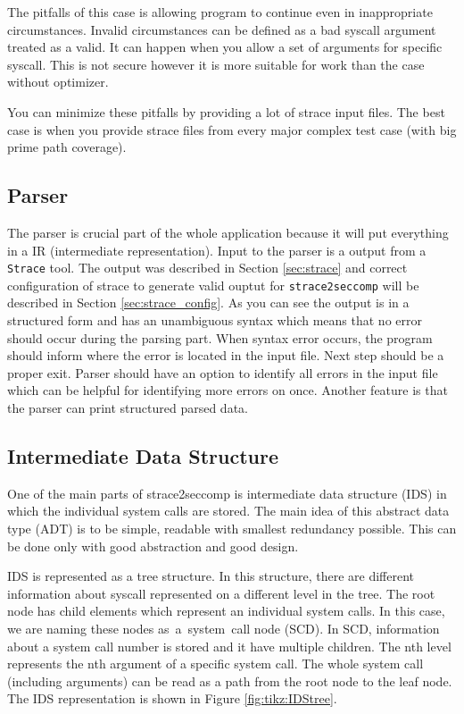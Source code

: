 The pitfalls of this case is allowing program to continue even in inappropriate circumstances.
Invalid circumstances can be defined as a bad syscall argument treated as a valid.
It can happen when you allow a set of arguments for specific syscall.
This is not secure however it is more suitable for work than the case without optimizer.

You can minimize these pitfalls by providing a lot of strace input files.
The best case is when you provide strace files from every major complex test case (with big prime path coverage).

\subsection{Parser}
The parser is crucial part of the whole application because it will put everything in a IR (intermediate representation).
Input to the parser is a output from a \texttt{Strace} tool.
The output was described in Section \ref{sec:strace} and correct configuration of strace to generate valid ouptut for \texttt{strace2seccomp} will be described in Section \ref{sec:strace_config}.
As you can see the output is in a structured form and has an unambiguous syntax which means that no error should occur during the parsing part.
When syntax error occurs, the program should inform where the error is located in the input file.
Next step should be a proper exit.
Parser should have an option to identify all errors in the input file which can be helpful for identifying more errors on once.
Another feature is that the parser can print structured parsed data.

\subsection{Intermediate Data Structure}
One of the main parts of strace2seccomp is intermediate data structure (IDS) in which the individual system calls are stored.
The main idea of this abstract data type (ADT) is to be simple, readable with smallest redundancy possible.
This can be done only with good abstraction and good design.

IDS is represented as a tree structure.
In this structure, there are different information about syscall represented on a different level in the tree.
The root node has child elements which represent an individual system calls.
In this case, we are naming these nodes as~a~system~call node (SCD).
In SCD, information about a system call number is stored and it have multiple children.
The nth level represents the nth argument of a specific system call.
The whole system call (including arguments) can be read as a path from the root node to the leaf node.
The IDS representation is shown in Figure \ref{fig:tikz:IDStree}.

